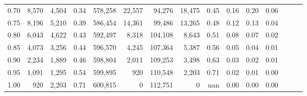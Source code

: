 \begin{tabular}{rrrrrrrrrrrrrrr}
0.70 &    8,570 &   4,504 &  0.34 &  578,258 &   22,557 &   94,276 &   18,475 &  0.45 &  0.16 &  0.20 &      0.06 \\
0.75 &    8,196 &   5,210 &  0.39 &  586,454 &   14,361 &   99,486 &   13,265 &  0.48 &  0.12 &  0.13 &      0.04 \\
0.80 &    6,043 &   4,622 &  0.43 &  592,497 &    8,318 &  104,108 &    8,643 &  0.51 &  0.08 &  0.07 &      0.02 \\
0.85 &    4,073 &   3,256 &  0.44 &  596,570 &    4,245 &  107,364 &    5,387 &  0.56 &  0.05 &  0.04 &      0.01 \\
0.90 &    2,234 &   1,889 &  0.46 &  598,804 &    2,011 &  109,253 &    3,498 &  0.63 &  0.03 &  0.02 &      0.01 \\
0.95 &    1,091 &   1,295 &  0.54 &  599,895 &      920 &  110,548 &    2,203 &  0.71 &  0.02 &  0.01 &      0.00 \\
1.00 &      920 &   2,203 &  0.71 &  600,815 &        0 &  112,751 &        0 &   nan &  0.00 &  0.00 &      0.00 \\
\bottomrule
\end{tabular}
